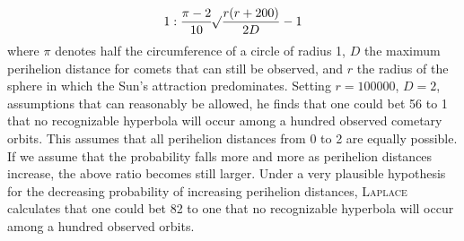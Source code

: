 \[1 : \frac{\pi-2}{10}\mathord{{}^{}\!\surd}\frac{r(r+200)}{2D} - 1\]
where $\pi$ denotes half the circumference of a circle of radius 1, $D$ the maximum perihelion distance for comets that can still be observed, and $r$ the radius of the sphere in which the Sun's attraction predominates. Setting $r = 100000$, $D = 2$, assumptions that can reasonably be allowed, he finds that one could bet 56 to 1 that no recognizable hyperbola will occur among a hundred observed cometary orbits. This assumes that all perihelion distances from 0 to 2 are equally possible. If we assume that the probability falls more and more as perihelion distances increase, the above ratio becomes still larger. Under a very plausible hypothesis for the decreasing probability of increasing perihelion distances, \textsc{Laplace} calculates that one could bet 82 to one that no recognizable hyperbola will occur among a hundred observed orbits.

